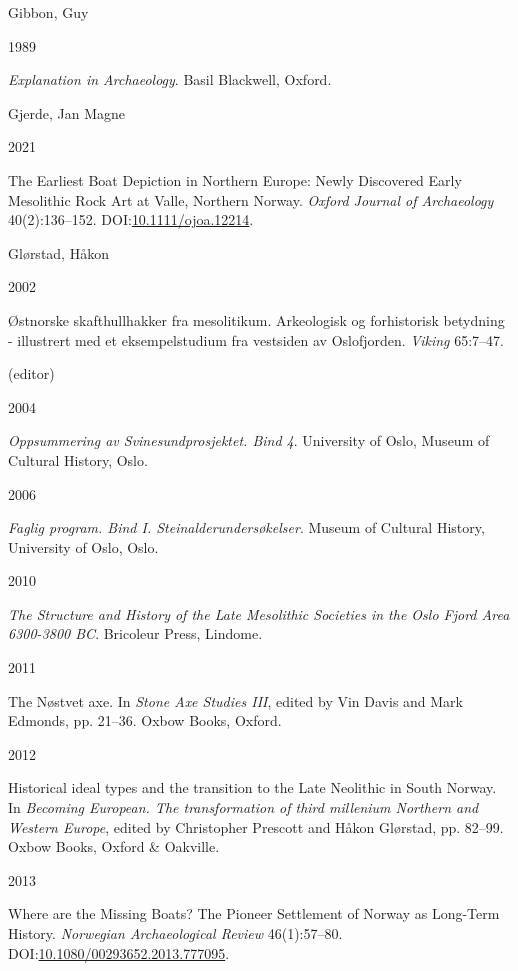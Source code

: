 \documentclass[
  12pt,
  a4paper,
  oneside]{book}
\newlength{\cslhangindent}
\newlength{\csllabelwidth}
\newlength{\cslentryspacingunit} %
\newenvironment{CSLReferences}[2] %
 {%
  \setlength{\parindent}{0pt}
  \ifodd #1
  \let\oldpar\par
  \def\par{\hangindent=\cslhangindent\oldpar}
  \fi
  \setlength{\parskip}{#2\cslentryspacingunit}
 }%
 {}
\newcommand{\CSLBlock}[1]{#1\hfill\break}
\newcommand{\CSLLeftMargin}[1]{\parbox[t]{\csllabelwidth}{#1}}
\newcommand{\CSLRightInline}[1]{\parbox[t]{\linewidth - \csllabelwidth}{#1}\break}
\begin{document}
\begin{CSLReferences}{0}{0}
\leavevmode{}%
\CSLBlock{Gibbon, Guy}
\CSLLeftMargin{ 1989}%
\CSLRightInline{\emph{{Explanation in Archaeology}}. Basil Blackwell, Oxford.}

\leavevmode{}%
\CSLBlock{Gjerde, Jan Magne}
\CSLLeftMargin{ 2021}%
\CSLRightInline{{The Earliest Boat Depiction in Northern Europe: Newly Discovered Early Mesolithic Rock Art at Valle, Northern Norway}. \emph{Oxford Journal of Archaeology} 40(2):136--152. DOI:\href{https://doi.org/10.1111/ojoa.12214}{10.1111/ojoa.12214}.}

\leavevmode{}%
\CSLBlock{Glørstad, Håkon}
\CSLLeftMargin{ 2002}%
\CSLRightInline{Østnorske skafthullhakker fra mesolitikum. Arkeologisk og forhistorisk betydning - illustrert med et eksempelstudium fra vestsiden av Oslofjorden. \emph{Viking} 65:7--47.}

\leavevmode{}%
\CSLBlock{ (editor)}
\CSLLeftMargin{ 2004}%
\CSLRightInline{\emph{{Oppsummering av Svinesundprosjektet. Bind 4}}. University of Oslo, Museum of Cultural History, Oslo.}

\leavevmode{}%
\CSLLeftMargin{ 2006 }%
\CSLRightInline{\emph{{Faglig program. Bind I. Steinalderundersøkelser}}. Museum of Cultural History, University of Oslo, Oslo.}

\leavevmode{}%
\CSLLeftMargin{ 2010 }%
\CSLRightInline{\emph{{The Structure and History of the Late Mesolithic Societies in the Oslo Fjord Area 6300-3800 BC}}. Bricoleur Press, Lindome.}

\leavevmode{}%
\CSLLeftMargin{ 2011 }%
\CSLRightInline{{The Nøstvet axe}. In \emph{{Stone Axe Studies III}}, edited by Vin Davis and Mark Edmonds, pp. 21--36. Oxbow Books, Oxford.}

\leavevmode{}%
\CSLLeftMargin{ 2012 }%
\CSLRightInline{{Historical ideal types and the transition to the Late Neolithic in South Norway}. In \emph{{Becoming European. The transformation of third millenium Northern and Western Europe}}, edited by Christopher Prescott and Håkon Glørstad, pp. 82--99. Oxbow Books, Oxford \& Oakville.}

\leavevmode{}%
\CSLLeftMargin{ 2013 }%
\CSLRightInline{{Where are the Missing Boats? The Pioneer Settlement of Norway as Long-Term History}. \emph{Norwegian Archaeological Review} 46(1):57--80. DOI:\href{https://doi.org/10.1080/00293652.2013.777095}{10.1080/00293652.2013.777095}.}


\end{CSLReferences}
\end{document}
